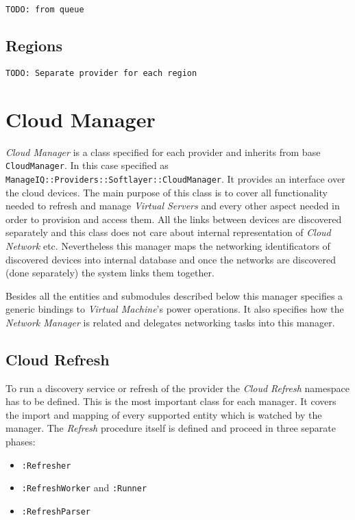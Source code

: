 \noindent\texttt{\color{OliveGreen}TODO: from queue}

\subsection{Regions}
\label{sub:Regions}

\noindent\texttt{\color{OliveGreen}TODO: Separate provider for each region}

\clearpage
\section{Cloud Manager}
\label{sec:Cloud Manager}

\emph{Cloud Manager} is a class specified for each provider and inherits from base \texttt{CloudManager}. In this case specified as \texttt{ManageIQ::Providers::Softlayer::CloudManager}. It provides an interface over the cloud devices. The main purpose of this class is to cover all functionality needed to refresh and manage \emph{Virtual Servers} and every other aspect needed in order to provision and access them. All the links between devices are discovered separately and this class does not care about internal representation of \emph{Cloud Network} etc. Nevertheless this manager maps the networking identificators of discovered devices into internal database and once the networks are discovered (done separately) the system links them together.

Besides all the entities and submodules described below this manager specifies a generic bindings to \emph{Virtual Machine}'s power operations. It also specifies how the \emph{Network Manager} is related and delegates networking tasks into this manager.

\subsection{Cloud Refresh}
\label{sub:Cloud Refresh}

To run a discovery service or refresh of the provider the \emph{Cloud Refresh} namespace has to be defined. This is the most important class for each manager. It covers the import and mapping of every supported entity which is watched by the manager. The \emph{Refresh} procedure itself is defined and proceed in three separate phases:

\begin{itemize}
	\item \texttt{:Refresher}
	\item \texttt{:RefreshWorker} and \texttt{:Runner}
	\item \texttt{:RefreshParser}
\end{itemize}

